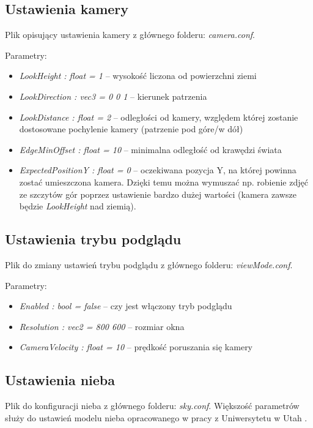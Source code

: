 \documentclass[inz,shortabstract]{iithesis}
\begin{document}
        \subsection{Ustawienia kamery} \label{cameraConfig}
        Plik opisujący ustawienia kamery z głównego folderu: \textit{camera.conf}.
        
        Parametry:
        \begin{itemize}
            \item \textit{LookHeight : float = 1} -- wysokość liczona od  powierzchni ziemi 
            \item \textit{LookDirection : vec3 = 0 0 1} -- kierunek patrzenia 
            \item \textit{LookDistance : float = 2} -- odległości od kamery, względem której zostanie dostosowane pochylenie kamery (patrzenie pod góre/w dół)
            \item \textit{EdgeMinOffset : float = 10} -- minimalna odległość od krawędzi świata  
            \item \textit{ExpectedPositionY : float = 0} -- oczekiwana pozycja Y, na której powinna zostać umieszczona kamera. Dzięki temu można wymuszać np. robienie zdjęć ze szczytów gór poprzez ustawienie bardzo dużej wartości (kamera zawsze będzie \textit{LookHeight} nad ziemią). 
        \end{itemize}
        
        \subsection{Ustawienia trybu podglądu} \label{viewModeConfig}
        Plik do zmiany ustawień trybu podglądu z głównego folderu: \textit{viewMode.conf}.
        
        Parametry:
        \begin{itemize}
            \item \textit{Enabled : bool = false} -- czy jest włączony tryb podglądu
            \item \textit{Resolution : vec2 = 800 600} -- rozmiar okna 
            \item \textit{CameraVelocity : float = 10} -- prędkość poruszania się kamery 
        \end{itemize}
        
        \subsection{Ustawienia nieba}
        Plik do konfiguracji nieba z głównego folderu: \textit{sky.conf}. Większość parametrów służy do ustawień modelu nieba opracowanego w pracy z Uniwersytetu w Utah \cite{sky}.
        
\end{document}
